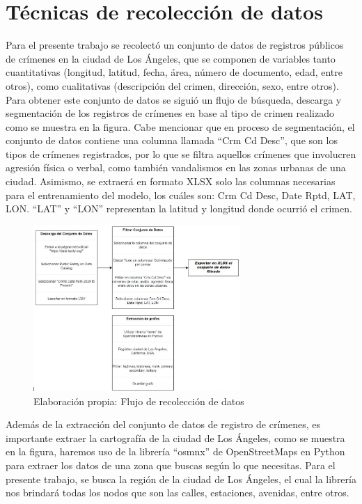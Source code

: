 \section{Técnicas de recolección de datos}
Para el presente trabajo se recolectó un conjunto de datos de registros públicos de crímenes en la ciudad de Los Ángeles, que se componen de variables tanto cuantitativas (longitud, latitud, fecha, área, número de documento, edad, entre otros), como cualitativas (descripción del crimen, dirección, sexo, entre otros). Para obtener este conjunto de datos se siguió un flujo de búsqueda, descarga y segmentación de los registros de crímenes en base al tipo de crimen realizado como se muestra en la figura. Cabe mencionar que en proceso de segmentación, el conjunto de datos contiene una columna llamada “Crm Cd Desc”, que son los tipos de crímenes registrados, por lo que se filtra aquellos crímenes que involucren agresión física o verbal, como también vandalismos en las zonas urbanas de una ciudad. Asimismo, se extraerá en formato XLSX solo las columnas necesarias para el entrenamiento del modelo, los cuáles son: Crm Cd Desc, Date Rptd, LAT, LON. “LAT” y “LON” representan la latitud y longitud donde ocurrió el crimen.
\medskip
\begin{figure}[h]
	\begin{center}
		\includegraphics[width=0.7\textwidth]{3/figures/flujoreco.jpg}
		\caption[Elaboración propia: Flujo de recolección de datos]{Elaboración propia: Flujo de recolección de datos}
		\label{1:fig}
	\end{center}
\end{figure}
\medskip
Además de la extracción del conjunto de datos de registro de crímenes, es importante extraer la cartografía de la ciudad de Los Ángeles, como se muestra en la figura, haremos uso de la librería “osmnx” de OpenStreetMaps en Python para extraer los datos de una zona que buscas según lo que necesitas. Para el presente trabajo, se busca la región de la ciudad de Los Ángeles, el cual la librería nos brindará todas los nodos que son las calles, estaciones, avenidas, entre otros.

